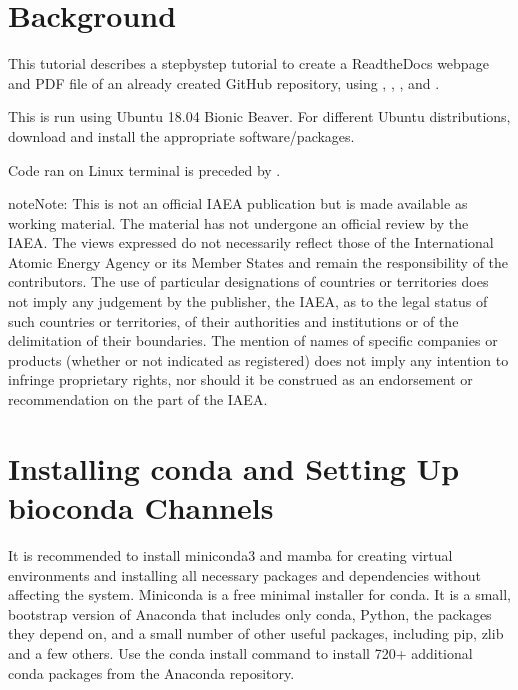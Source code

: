 \documentclass[letterpaper,10pt,english]{sphinxhowto}
\begin{document}
\pagestyle{plain}
\sphinxtableofcontents
\pagestyle{normal}
\label{\detokenize{index::doc}}



\section{Background}
\label{\detokenize{index:background}}
\sphinxAtStartPar
This tutorial describes a step\sphinxhyphen{}by\sphinxhyphen{}step tutorial to create a ReadtheDocs webpage and PDF file of an already created GitHub repository, using , , , and .

\sphinxAtStartPar
This is run using Ubuntu 18.04 Bionic Beaver. For different Ubuntu distributions, download and install the appropriate software/packages.

\sphinxAtStartPar
Code ran on Linux terminal is preceded by \sphinxcode{\sphinxupquote{\$}}.

\begin{sphinxadmonition}{note}{Note:}
\sphinxAtStartPar
This is not an official IAEA publication but is made available as working material. The material has not undergone an official review by the IAEA. The views expressed do not necessarily reflect those of the International Atomic Energy Agency or its Member States and remain the responsibility of the contributors. The use of particular designations of countries or territories does not imply any judgement by the publisher, the IAEA, as to the legal status of such countries or territories, of their authorities and institutions or of the delimitation of their boundaries. The mention of names of specific companies or products (whether or not indicated as registered) does not imply any intention to infringe proprietary rights, nor should it be construed as an endorsement or recommendation on the part of the IAEA.
\end{sphinxadmonition}


\section{Installing conda and Setting Up bioconda Channels}
\label{\detokenize{index:installing-conda-and-setting-up-bioconda-channels}}
\sphinxAtStartPar
It is recommended to install miniconda3 and mamba for creating virtual environments and installing all necessary packages and dependencies without affecting the system. Miniconda is a free minimal installer for conda. It is a small, bootstrap version of Anaconda that includes only conda, Python, the packages they depend on, and a small number of other useful packages, including pip, zlib and a few others. Use the conda install command to install 720+ additional conda packages from the Anaconda repository.
\end{document}
